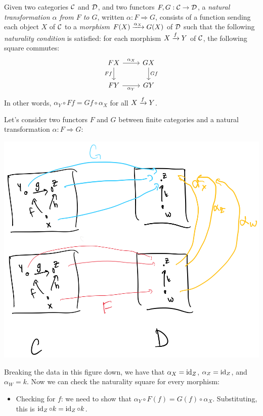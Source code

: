 \begin{definition}
  \sloppy
  Given two categories \(\mathcal C\) and \(\mathcal D\),
  and two functors \(F,G : \mathcal C \to \mathcal D\),
  a \emph{natural transformation \(\alpha\) from \(F\) to \(G\)},
  written
  \(\alpha : F \Rightarrow G\),
  consists of a function sending each object \(X\) of \(\mathcal C\) to a \emph{morphism} \(F(X) \xrightarrow{\alpha_X} G(X)\) of \(\mathcal D\)
  such that the following \emph{naturality condition} is satisfied:
  for each morphism \(X \xrightarrow{f} Y\) of \(\mathcal C\), the following square commutes:
  \[
\begin{tikzcd}
FX \arrow[d, "Ff"'] \arrow[r, "\alpha_X"] & GX \arrow[d, "Gf"] \\
FY \arrow[r, "\alpha_Y"']                 & GY
\end{tikzcd}
  \]
  In other words, \(\alpha_Y \circ Ff = Gf \circ \alpha_X\) for all \(X \xrightarrow{f} Y\).
\end{definition}

Let's consider two functors $F$ and $G$ between finite categories and a 
natural transformation $\alpha : F \Rightarrow G$:
\begin{center}
\includegraphics[width=0.8\linewidth]{fig/nat-trans1.png}
\end{center}

Breaking the data in this figure down, we have that $\alpha_X = \operatorname{id}_Z$, 
$\alpha_Z = \operatorname{id}_Z$, and $\alpha_W = k$. Now we can 
check the naturality square for every morphism:
\begin{itemize}
  \item Checking for $f$: we need to show that $\alpha_Y \circ F(f) = G(f) \circ \alpha_X$.
  Substituting, this is $\operatorname{id}_Z \circ k = \operatorname{id}_Z \circ k$.
\end{itemize}


